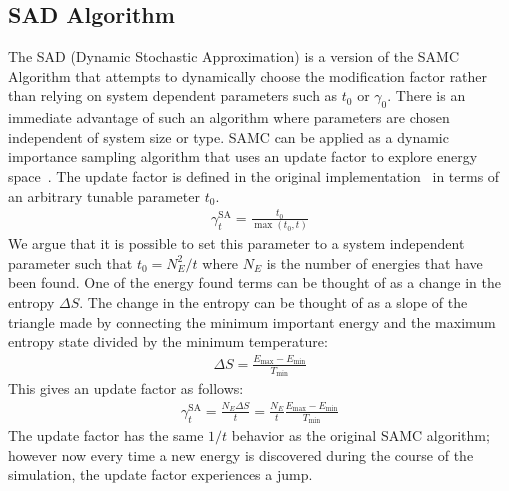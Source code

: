 \documentclass[letterpaper,twocolumn,amsmath,amssymb,pre,aps,10pt]{revtex4-1}
\begin{document}
\subsection{SAD Algorithm}
The SAD (Dynamic Stochastic Approximation) is a version of the SAMC
Algorithm that attempts to dynamically choose the modification factor
rather than relying on system dependent parameters such as $t_0$ or
$\gamma_0$.  There is an immediate advantage of such an algorithm where
parameters are chosen independent of system size or type. SAMC can be
applied as a dynamic importance sampling algorithm that uses an update
factor to explore energy space~\cite{liang2007stochastic,
werlich2015stochastic, schneider2017convergence}.  The update factor is
defined in the original implementation~\cite{liang2007stochastic} in
terms of an arbitrary tunable parameter $t_0$.
\begin{align}
\gamma_{t}^{\text{SA}} = \frac{t_0}{\max(t_0,t)}
\end{align}
We argue that it is possible to set this parameter to a system
independent parameter such that $t_0 = N_E^2/t$ where $N_E$ is the
number of energies that have been found.  One of the energy found terms
can be thought of as a change in the entropy $\Delta S$.  The change in
the entropy can be thought of as a slope of the triangle made by
connecting the minimum important energy and the maximum entropy state
divided by the minimum temperature:
\begin{align}
\Delta S = \frac{E_{\text{max}}-E_{\text{min}}}{T_{\text{min}}}
\end{align}
This gives an update factor as follows:
\begin{align}
\gamma_{t}^{\text{SA}} = \frac{N_E\Delta S}{t} =
\frac{N_E}{t}\frac{E_{\text{max}}-E_{\text{min}}}{T_{\text{min}}}
\end{align}
The update factor has the same $1/t$ behavior as the original SAMC
algorithm; however now every time a new energy is discovered during the
course of the simulation, the update factor experiences a jump.
\end{document}
